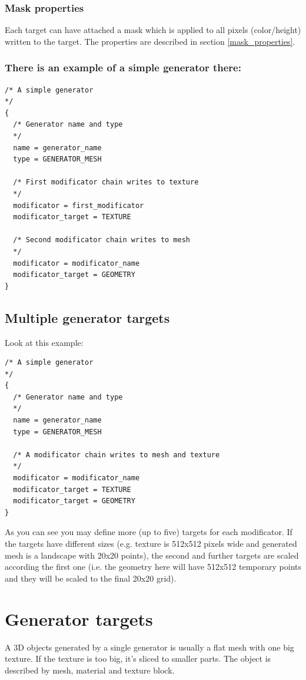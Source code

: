 \documentclass[9pt]{article}
\begin{document}
\subsubsection*{Mask properties}
Each target can have attached a mask which is applied to all pixels (color/height) 
written to the target. The properties are described in section \ref{mask_properties}. 

\subsubsection*{There is an example of a simple generator there:}

\begin{verbatim}
/* A simple generator
*/
{
  /* Generator name and type
  */
  name = generator_name
  type = GENERATOR_MESH
  
  /* First modificator chain writes to texture
  */
  modificator = first_modificator
  modificator_target = TEXTURE
  
  /* Second modificator chain writes to mesh
  */
  modificator = modificator_name  
  modificator_target = GEOMETRY
}
\end{verbatim}

\subsection{Multiple generator targets}
\label{multiple_targets}

Look at this example:

\begin{verbatim}
/* A simple generator
*/
{
  /* Generator name and type
  */
  name = generator_name
  type = GENERATOR_MESH
  
  /* A modificator chain writes to mesh and texture
  */
  modificator = modificator_name
  modificator_target = TEXTURE
  modificator_target = GEOMETRY
}
\end{verbatim}

As you can see you may define more (up to five) targets for each modificator. 
If the targets have different sizes (e.g. texture is 512x512 pixels wide 
and generated mesh is a landscape with 20x20 points), the second and further 
targets are scaled according the first one (i.e. the geometry here will have 
512x512 temporary points and they will be scaled to the final 20x20 grid).

\newpage
\section{Generator targets}
A 3D objects generated by a single generator is usually a flat mesh with
one big texture. If the texture is too big, it's sliced to smaller parts.
The object is described by mesh, material and texture block.
\end{document}
